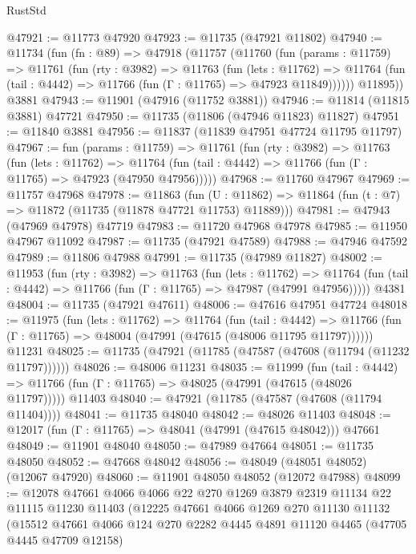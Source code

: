 \begin{lexlean}{RustStd}
\begin{coremodule}
@47921 := @11773 @47920
@47923 := @11735 (@47921 @11802)
@47940 := @11734
    (fun (fn : @89) =>
    @47918
      (@11757
        (@11760
          (fun (params : @11759) =>
          @11761
            (fun (rty : @3982) =>
            @11763
              (fun (lets : @11762) =>
              @11764 (fun (tail : @4442) => @11766 (fun (Γ : @11765) => @47923 @11849))))))
        @11895))
    @3881
@47943 := @11901 (@47916 (@11752 @3881))
@47946 := @11814 (@11815 @3881) @47721
@47950 := @11735 (@11806 (@47946 @11823) @11827)
@47951 := @11840 @3881
@47956 := @11837 (@11839 @47951 @47724 @11795 @11797)
@47967 := fun (params : @11759) =>
  @11761
    (fun (rty : @3982) =>
    @11763
      (fun (lets : @11762) =>
      @11764 (fun (tail : @4442) => @11766 (fun (Γ : @11765) => @47923 (@47950 @47956)))))
@47968 := @11760 @47967
@47969 := @11757 @47968
@47978 := @11863
    (fun (U : @11862) => @11864 (fun (t : @7) => @11872 (@11735 (@11878 @47721 @11753) @11889)))
@47981 := @47943 (@47969 @47978) @47719
@47983 := @11720 @47968 @47978
@47985 := @11950 @47967 @11092
@47987 := @11735 (@47921 @47589)
@47988 := @47946 @47592
@47989 := @11806 @47988
@47991 := @11735 (@47989 @11827)
@48002 := @11953
    (fun (rty : @3982) =>
    @11763
      (fun (lets : @11762) =>
      @11764 (fun (tail : @4442) => @11766 (fun (Γ : @11765) => @47987 (@47991 @47956)))))
    @4381
@48004 := @11735 (@47921 @47611)
@48006 := @47616 @47951 @47724
@48018 := @11975
    (fun (lets : @11762) =>
    @11764
      (fun (tail : @4442) =>
      @11766 (fun (Γ : @11765) => @48004 (@47991 (@47615 (@48006 @11795 @11797))))))
    @11231
@48025 := @11735 (@47921 (@11785 (@47587 (@47608 (@11794 (@11232 @11797))))))
@48026 := @48006 @11231
@48035 := @11999
    (fun (tail : @4442) => @11766 (fun (Γ : @11765) => @48025 (@47991 (@47615 (@48026 @11797)))))
    @11403
@48040 := @47921 (@11785 (@47587 (@47608 (@11794 @11404))))
@48041 := @11735 @48040
@48042 := @48026 @11403
@48048 := @12017 (fun (Γ : @11765) => @48041 (@47991 (@47615 @48042))) @47661
@48049 := @11901 @48040
@48050 := @47989 @47664
@48051 := @11735 @48050
@48052 := @47668 @48042
@48056 := @48049 (@48051 @48052) (@12067 @47920)
@48060 := @11901 @48050 @48052 (@12072 @47988)
@48099 := @12078
    @47661
    @4066
    @4066
    @22
    @270
    @1269
    @3879
    @2319
    @11134
    @22
    @11115
    @11230
    @11403
    (@12225
      @47661
      @4066
      @1269
      @270
      @11130
      @11132
      (@15512
        @47661
        @4066
        @124
        @270
        @2282
        @4445
        @4891
        @11120
        @4465
        (@47705 @4445 @47709 @12158)

\end{coremodule}
\end{lexlean}
